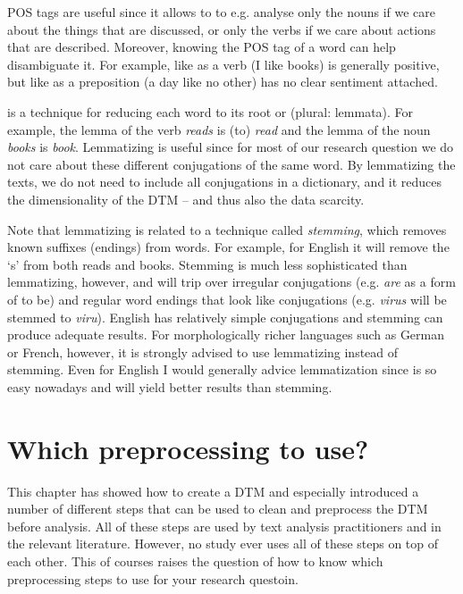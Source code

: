 POS tags are useful since it allows to to e.g. analyse only the nouns if we care about the things that are discussed, or only the verbs if we care about actions that are described.
Moreover, knowing the POS tag of a word can help disambiguate it.
For example, like as a verb (I like books) is generally positive, but like as a preposition (a day like no other) has no clear sentiment attached.

 is a technique for reducing each word to its root or  (plural: lemmata).
For example, the lemma of the verb \emph{reads} is (to) \emph{read} and the lemma of the noun \emph{books} is \emph{book}.
Lemmatizing is useful since for most of our research question we do not care about these different conjugations of the same word.
By lemmatizing the texts, we do not need to include all conjugations in a dictionary,
and it reduces the dimensionality of the DTM -- and thus also the data scarcity.

Note that lemmatizing is related to a technique called \emph{stemming}, which removes known suffixes (endings) from words.
For example, for English it will remove the `s' from both reads and books.
Stemming is much less sophisticated than lemmatizing, however, and will trip over irregular conjugations
(e.g. \emph{are} as a form of to be) and regular word endings that look like conjugations (e.g. \emph{virus} will be stemmed to \emph{viru}).
English has relatively simple conjugations and stemming can produce adequate results.
For morphologically richer languages such as German or French, however, it is strongly advised to use lemmatizing instead of stemming.
Even for English I would generally advice lemmatization since is so easy nowadays and will yield better results than stemming.


\section{Which preprocessing to use?}

This chapter has showed how to create a DTM and especially introduced a number of different steps that can be used to clean and preprocess the DTM before analysis.
All of these steps are used by text analysis practitioners and in the relevant literature.
However, no study ever uses all of these steps on top of each other.
This of courses raises the question of how to know which preprocessing steps to use for your research questoin.

